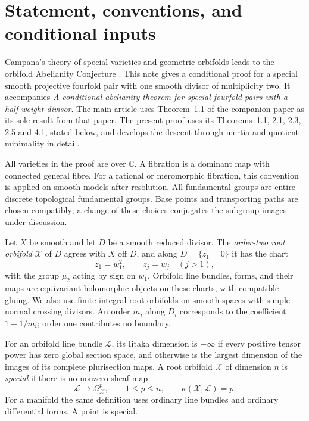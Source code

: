 \section{Statement, conventions, and conditional inputs}
\label{in:statement}

Campana's theory of special varieties and geometric orbifolds
\cite{Campana2004,CampanaOrbifolds} leads to the orbifold Abelianity
Conjecture \cite[Conjecture~12.10(1)]{CampanaOrbifolds}. This note
gives a conditional proof for a special smooth projective fourfold pair
with one smooth divisor of multiplicity two. It accompanies \emph{A
conditional abelianity theorem for special fourfold pairs with a
half-weight divisor}. The main article uses Theorem~1.1 of the companion
paper \cite{Supplied} as its sole result from that paper. The present proof uses its
Theorems~1.1, 2.1, 2.3, 2.5 and 4.1, stated below, and develops the
descent through inertia and quotient minimality in detail.

All varieties in the proof are over $\mathbb C$.  A fibration is a
dominant map with connected general fibre.  For a rational or meromorphic
fibration, this convention is applied on smooth models after resolution.
All fundamental groups are entire discrete topological fundamental
groups.  Base points and transporting paths are chosen compatibly; a
change of these choices conjugates the subgroup images under discussion.

Let $X$ be smooth and let $D$ be a smooth reduced divisor.  The
\emph{order-two root orbifold} $\mathcal X$ of $D$ agrees with $X$ off
$D$, and along $D=\{z_1=0\}$ it has the chart
\[
 z_1=w_1^2,\qquad z_j=w_j\quad (j>1),
\]
with the group $\mu_2$ acting by sign on $w_1$.  Orbifold line bundles,
forms, and their maps are equivariant holomorphic objects on these
charts, with compatible gluing.  We also use finite integral root
orbifolds on smooth spaces with simple normal crossing divisors.  An
order $m_i$ along $D_i$ corresponds to the coefficient $1-1/m_i$;
order one contributes no boundary.

For an orbifold line bundle $\mathcal L$, its Iitaka dimension is
$-\infty$ if every positive tensor power has zero global section space,
and otherwise is the largest dimension of the images of its complete
plurisection maps.  A root orbifold $\mathcal X$ of dimension $n$ is
\emph{special} if there is no nonzero sheaf map
\[
 \mathcal L\longrightarrow\Omega^p_{\mathcal X},
 \qquad 1\le p\le n,
 \qquad \kappa(\mathcal X,\mathcal L)=p.
\]
For a manifold the same definition uses ordinary line bundles and
ordinary differential forms.  A point is special.

